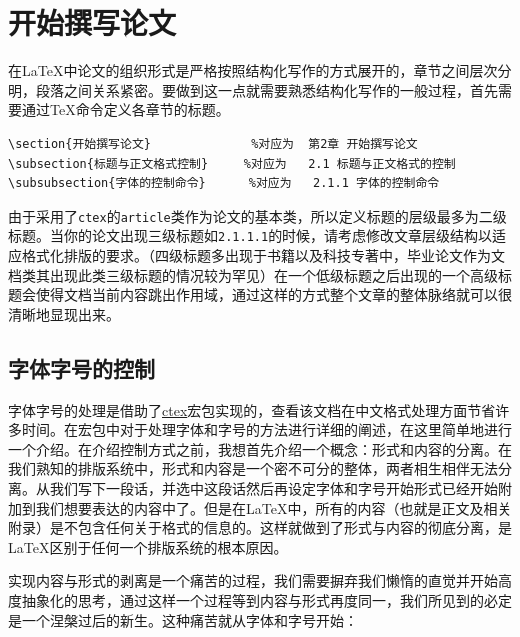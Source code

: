 \section{开始撰写论文}
在\LaTeX 中论文的组织形式是严格按照结构化写作的方式展开的，章节之间层次分明，段落之间关系紧密。要做到这一点就需要熟悉结构化写作的一般过程，首先需要通过\TeX 命令定义各章节的标题。
\begin{verbatim}
\section{开始撰写论文}              %对应为  第2章 开始撰写论文
\subsection{标题与正文格式控制}     %对应为   2.1 标题与正文格式的控制 
\subsubsection{字体的控制命令}      %对应为   2.1.1 字体的控制命令
\end{verbatim}
由于采用了\verb|ctex|的\verb|article|类作为论文的基本类，所以定义标题的层级最多为二级标题。当你的论文出现三级标题如\verb|2.1.1.1|的时候，请考虑修改文章层级结构以适应格式化排版的要求。（四级标题多出现于书籍以及科技专著中，毕业论文作为文档类其出现此类三级标题的情况较为罕见）在一个低级标题之后出现的一个高级标题会使得文档当前内容跳出作用域，通过这样的方式整个文章的整体脉络就可以很清晰地显现出来。
\subsection{字体字号的控制}
字体字号的处理是借助了\href{http://mirror.hust.edu.cn/CTAN/language/chinese/ctex/doc/ctex.pdf}{ctex}宏包实现的，查看该文档在中文格式处理方面节省许多时间。在宏包中对于处理字体和字号的方法进行详细的阐述，在这里简单地进行一个介绍。在介绍控制方式之前，我想首先介绍一个概念：形式和内容的分离。在我们熟知的排版系统中，形式和内容是一个密不可分的整体，两者相生相伴无法分离。从我们写下一段话，并选中这段话然后再设定字体和字号开始形式已经开始附加到我们想要表达的内容中了。但是在\LaTeX 中，所有的内容（也就是正文及相关附录）是不包含任何关于格式的信息的。这样就做到了形式与内容的彻底分离，是\LaTeX 区别于任何一个排版系统的根本原因。

实现内容与形式的剥离是一个痛苦的过程，我们需要摒弃我们懒惰的直觉并开始高度抽象化的思考，通过这样一个过程等到内容与形式再度同一，我们所见到的必定是一个涅槃过后的新生。这种痛苦就从字体和字号开始：
